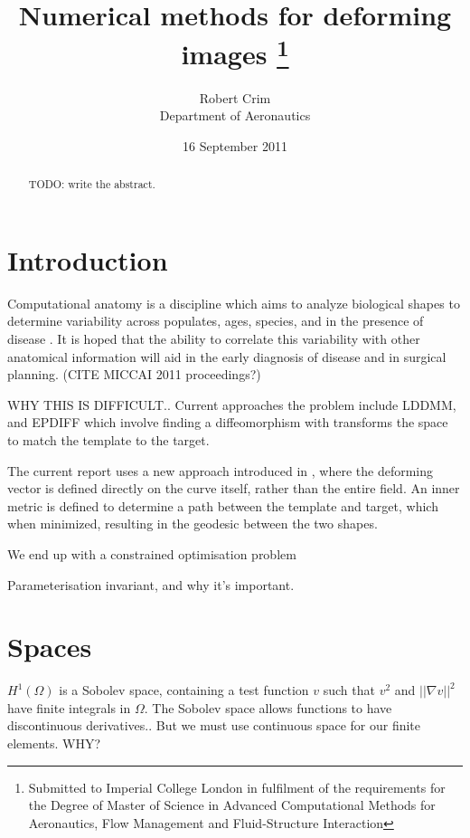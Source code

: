 \documentclass[a4paper, 12pt]{article}
\begin{document}
\author{Robert Crim \\ Department of Aeronautics}
\date{16 September 2011}
\title{Numerical methods for deforming images
\thanks{Submitted to Imperial College London in fulfilment of the requirements for the Degree of Master of Science in Advanced Computational Methods for Aeronautics, Flow Management and Fluid-Structure Interaction}}

\maketitle
\newpage
\begin{abstract}
TODO: write the abstract.
\end{abstract}
\newpage
\tableofcontents
\newpage


\section{Introduction}


 Computational anatomy is a discipline which aims to analyze biological shapes to determine variability across populates, ages, species, and in the presence of disease \cite{miller2009emerging}. It is hoped that the ability to correlate this variability with other anatomical information will aid in the early diagnosis of disease and in surgical planning. (CITE MICCAI 2011 proceedings?)

WHY THIS IS DIFFICULT..
Current approaches the problem include LDDMM, and EPDIFF  \cite{cotter2006singular, cotter2009curves} which involve finding a diffeomorphism with transforms the space to match the template to the target. 

The current report uses a new approach introduced in \cite{bauer2011new}, where the deforming vector is defined directly on the curve itself, rather than the entire field. An inner metric is defined to determine a path between the template and target, which when minimized, resulting in the geodesic between the two shapes.

We end up with a constrained optimisation problem

Parameterisation invariant, and why it's important.


\section{Spaces}


$H^1(\Omega)$ is a Sobolev space, containing a test function $v$ such that $v^2$ and $||\nabla v||^2$ have finite integrals in $\Omega$. The Sobolev space allows functions to have discontinuous derivatives.. But we must use continuous space for our finite elements. WHY? 
\end{document}
